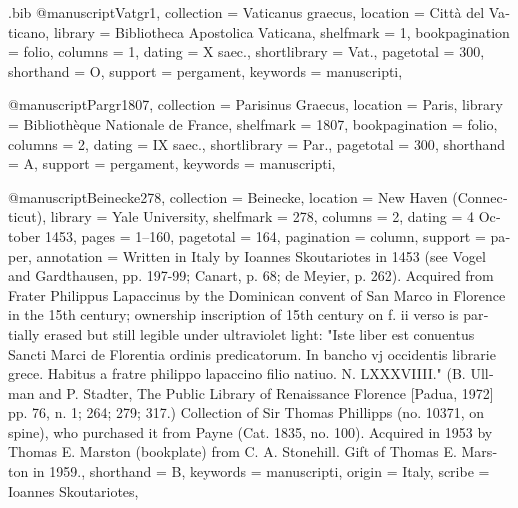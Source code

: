 
\begin{filecontents}{\jobname.bib}
@manuscript{Vatgr1,
  collection     = {Vaticanus graecus},
  location       = {Città del Vaticano},
  library        = {Bibliotheca Apostolica Vaticana},
  shelfmark      = {1},
  bookpagination = {folio},
  columns        = {1},
  dating         = {X saec.},
  shortlibrary   = {Vat.},
  pagetotal      = {300},
  shorthand      = {O},
  support        = {pergament},
  keywords       = {manuscripti},
}

@manuscript{Pargr1807,
  collection     = {Parisinus Graecus},
  location       = {Paris},
  library        = {Bibliothèque Nationale de France},
  shelfmark      = {1807},
  bookpagination = {folio},
  columns        = {2},
  dating         = {IX saec.},
  shortlibrary   = {Par.},
  pagetotal      = {300},
  shorthand      = {A},
  support        = {pergament},
  keywords       = {manuscripti},
}

@manuscript{Beinecke278,
  collection = {Beinecke},
  location   = {New Haven (Connecticut)},
  library    = {Yale University},
  shelfmark  = {278},
  columns    = {2},
  dating     = {4 October 1453},
  pages      = {1\recto--160\recto},
  pagetotal  = {164},
  pagination = {column},
  support    = {paper},
  annotation = {Written in Italy by Ioannes Skoutariotes in 1453 (see Vogel and Gardthausen, pp. 197-99; Canart, p. 68; de Meyier, p. 262). Acquired from Frater Philippus Lapaccinus by the Dominican convent of San Marco in Florence in the 15th century; ownership inscription of 15th century on f. ii verso is partially erased but still legible under ultraviolet light: "Iste liber est conuentus Sancti Marci de Florentia ordinis predicatorum. In bancho vj occidentis librarie grece. Habitus a fratre philippo lapaccino filio natiuo. N. LXXXVIIII." (B. Ullman and P. Stadter, The Public Library of Renaissance Florence [Padua, 1972] pp. 76, n. 1; 264; 279; 317.) Collection of Sir Thomas Phillipps (no. 10371, on spine), who purchased it from Payne (Cat. 1835, no. 100). Acquired in 1953 by Thomas E. Marston (bookplate) from C. A. Stonehill. Gift of Thomas E. Marston in 1959.},
  shorthand      = {B},
  keywords   = {manuscripti},
  origin     = {Italy},
  scribe     = {Ioannes Skoutariotes},
}
\end{filecontents}

\documentclass{article}
\usepackage{filecontents}

\usepackage{polyglossia}
	\setmainlanguage{french}
\usepackage{libertinus-otf}

\usepackage[
	backend=biber,%
	language=italian,%
	autolang=other,%
	bibstyle=manuscripts-noautoshorthand,
	]{biblatex}



\cite{Vatgr1}


\nocite{*}
\printshorthands[type=manuscript,title=Conspectus siglorum]

\printshorthands[type=manuscript,env=details,title=Description of manuscripts]

